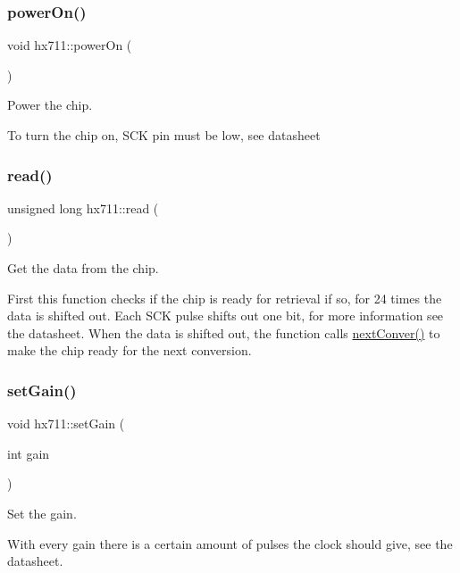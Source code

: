 \subsubsection{\texorpdfstring{power\+On()}{powerOn()}}
{\footnotesize\ttfamily void hx711\+::power\+On (\begin{DoxyParamCaption}{ }\end{DoxyParamCaption})}



Power the chip. 

To turn the chip on, S\+CK pin must be low, see datasheet \mbox{\label{classhx711_a5dc85e1232264d571512f75b6bad90d5}} 
\subsubsection{\texorpdfstring{read()}{read()}}
{\footnotesize\ttfamily unsigned long hx711\+::read (\begin{DoxyParamCaption}{ }\end{DoxyParamCaption})}



Get the data from the chip. 

First this function checks if the chip is ready for retrieval if so, for 24 times the data is shifted out. Each S\+CK pulse shifts out one bit, for more information see the datasheet. When the data is shifted out, the function calls \hyperlink{classhx711_adf28a62a6d06f522614694ab4df96f3f}{next\+Conver()} to make the chip ready for the next conversion. \mbox{\label{classhx711_aeaaa5d42da78c5db98f98ce3f6e6cc55}} 
\subsubsection{\texorpdfstring{set\+Gain()}{setGain()}}
{\footnotesize\ttfamily void hx711\+::set\+Gain (\begin{DoxyParamCaption}\item[{int}]{gain }\end{DoxyParamCaption})}



Set the gain. 

With every gain there is a certain amount of pulses the clock should give, see the datasheet. \mbox{\label{classhx711_a837e9ae5cc8d8f22281e2e43be139606}} 
